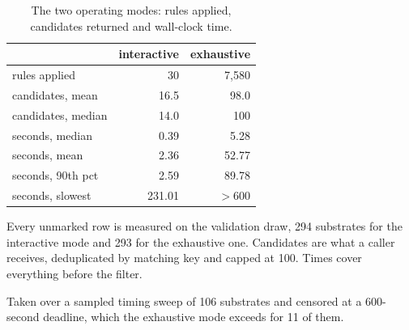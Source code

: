 \begin{table}[t]
\centering\footnotesize
\begin{threeparttable}
\caption{The two operating modes: rules applied, candidates returned and wall-clock time.}
\label{tab:modes}
\begin{tabular}{lrr}
\toprule
 & interactive & exhaustive \\
\midrule
rules applied & 30 & 7{,}580 \\
candidates, mean & 16.5 & 98.0 \\
candidates, median & 14.0 & 100 \\
seconds, median & 0.39 & 5.28 \\
seconds, mean & 2.36 & 52.77\tnote{a} \\
seconds, 90th pct & 2.59 & 89.78\tnote{a} \\
seconds, slowest & 231.01 & $>600$\tnote{a} \\
\bottomrule
\end{tabular}
\begin{tablenotes}[flushleft]\footnotesize
\item Every unmarked row is measured on the validation draw, 294 substrates for the
interactive mode and 293 for the exhaustive one. Candidates are what a caller
receives, deduplicated by matching key and capped at 100. Times cover
everything before the filter.
\item[a] Taken over a sampled timing sweep of 106 substrates and censored at a
600-second deadline, which the exhaustive mode exceeds for 11 of them.
\end{tablenotes}
\end{threeparttable}
\end{table}
